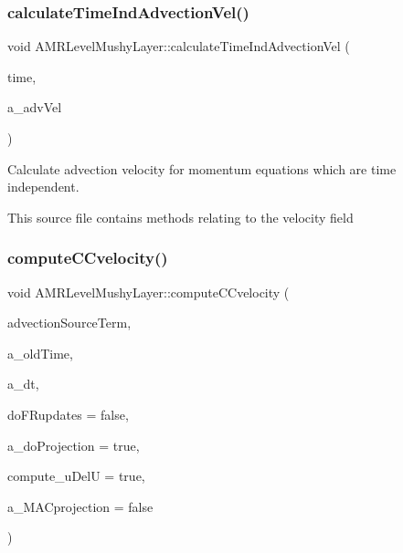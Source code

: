 \subsubsection{\texorpdfstring{calculate\+Time\+Ind\+Advection\+Vel()}{calculateTimeIndAdvectionVel()}}
{\footnotesize\ttfamily void A\+M\+R\+Level\+Mushy\+Layer\+::calculate\+Time\+Ind\+Advection\+Vel (\begin{DoxyParamCaption}\item[{\textbf{ Real}}]{time,  }\item[{\textbf{ Level\+Data}$<$ \textbf{ Flux\+Box} $>$ \&}]{a\+\_\+adv\+Vel }\end{DoxyParamCaption})\hspace{0.3cm}{\ttfamily [protected]}}



Calculate advection velocity for momentum equations which are time independent. 

This source file contains methods relating to the velocity field \mbox{\label{class_a_m_r_level_mushy_layer_a2fd9b54613cbc9b22453ecf6986f2cf0}} 
\subsubsection{\texorpdfstring{compute\+C\+Cvelocity()}{computeCCvelocity()}}
{\footnotesize\ttfamily void A\+M\+R\+Level\+Mushy\+Layer\+::compute\+C\+Cvelocity (\begin{DoxyParamCaption}\item[{const \textbf{ Level\+Data}$<$ \textbf{ F\+Array\+Box} $>$ \&}]{advection\+Source\+Term,  }\item[{\textbf{ Real}}]{a\+\_\+old\+Time,  }\item[{\textbf{ Real}}]{a\+\_\+dt,  }\item[{bool}]{do\+F\+Rupdates = {\ttfamily false},  }\item[{bool}]{a\+\_\+do\+Projection = {\ttfamily true},  }\item[{bool}]{compute\+\_\+u\+DelU = {\ttfamily true},  }\item[{bool}]{a\+\_\+\+M\+A\+Cprojection = {\ttfamily false} }\end{DoxyParamCaption})\hspace{0.3cm}{\ttfamily [protected]}}



